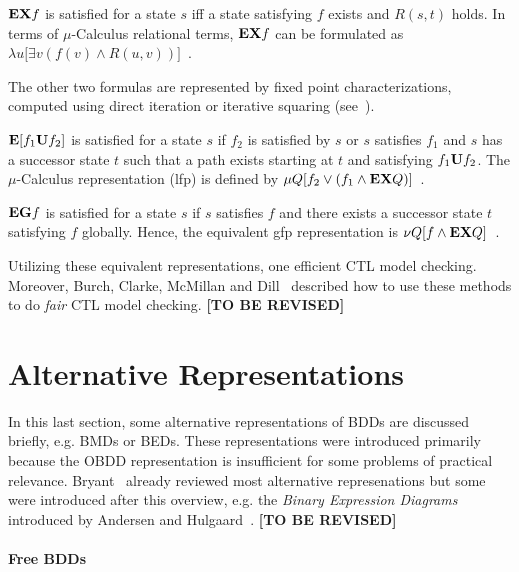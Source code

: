 \documentclass{vldb}
\newcommand{\tbr}{\textbf{[TO BE REVISED]}}
\begin{document}
$\text{\textbf{EX}} f$ is satisfied for a state $s$ iff a state satisfying $f$
exists and $R \left( s, t \right)$ holds. In terms of $\mu$-Calculus relational
terms, $\text{\textbf{EX}} f$ can be formulated as
$\lambda u \lbrack \exists v \left( f(v) \land R \left( u, v \right) \right) \rbrack$~\cite{BURCH90}.

The other two formulas are represented by fixed point characterizations, computed
using direct iteration or iterative squaring (see~\cite[p. 433]{BURCH90}).

$\text{\textbf{E}} \lbrack f_1 \text{\textbf{U}} f_2 \rbrack$ is satisfied for a
state $s$ if $f_2$ is satisfied by $s$ or $s$ satisfies $f_1$ and $s$ has a
successor state $t$ such that a path exists starting at $t$ and satisfying
$f_1 \text{\textbf{U}} f_2$. The $\mu$-Calculus representation (lfp) is defined by
$\mu Q \lbrack f_2 \lor \left( f_1 \land \text{\textbf{EX}} Q \right) \rbrack$~\cite{BURCH90}.

$\text{\textbf{EG}} f$ is satisfied for a state $s$ if $s$ satisfies $f$ and there
exists a successor state $t$ satisfying $f$ globally. Hence, the equivalent 
gfp representation is
$\nu Q \lbrack f \land \text{\textbf{EX}} Q \rbrack$~\cite{BURCH90}.

Utilizing these equivalent representations, one efficient CTL model checking.
Moreover, Burch, Clarke, McMillan and Dill~\cite{BURCH90-2} described how to use
these methods to do \textit{fair} CTL model checking. \tbr

\section{Alternative Representations}
\label{sec:alternative-representations}

In this last section, some alternative representations of BDDs are discussed
briefly, e.g. BMDs or BEDs. These representations were introduced primarily
because the OBDD representation is insufficient for some problems of practical
relevance. Bryant~\cite{BRYANT95} already reviewed most alternative represenations
but some were introduced after this overview, e.g. the
\textit{Binary Expression Diagrams} introduced by Andersen and
Hulgaard~\cite{ANDERSEN97}. \tbr

\paragraph*{Free BDDs}
\mbox{} %
\end{document}
